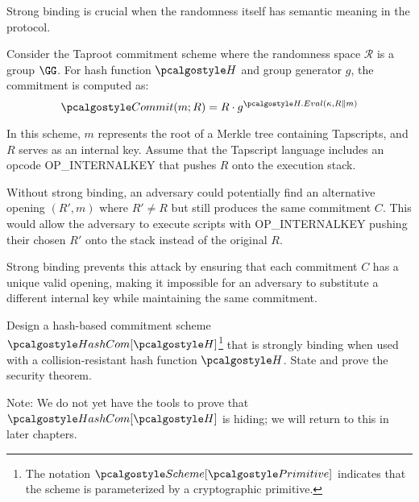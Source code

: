 \ifsolutions
\begin{mysolution}
  Strong binding is crucial when the randomness itself has semantic meaning in the protocol.

  Consider the Taproot commitment scheme where the randomness space $\mathcal{R}$ is a group $\GG$.
  For hash function $\algo{H}$ and group generator $g$, the commitment is computed as:
  \[
    \algo{Commit}(m; R) = R \cdot g^{\algo{H.Eval}(\kappa, R \| m)}
  \]

  In this scheme, $m$ represents the root of a Merkle tree containing Tapscripts, and $R$ serves as an internal key.
  Assume that the Tapscript language includes an opcode OP\_INTERNALKEY that pushes $R$ onto the execution stack.

  Without strong binding, an adversary could potentially find an alternative opening $(R', m)$ where $R' \neq R$ but still produces the same commitment $C$.
  This would allow the adversary to execute scripts with OP\_INTERNALKEY pushing their chosen $R'$ onto the stack instead of the original $R$.

  Strong binding prevents this attack by ensuring that each commitment $C$ has a unique valid opening, making it impossible for an adversary to substitute a different internal key while maintaining the same commitment.
\end{mysolution}
\fi

\begin{exercise}
  Design a hash-based commitment scheme $\algo{HashCom}[\algo{H}]$\footnote{The notation $\algo{Scheme}[\algo{Primitive}]$ indicates that the scheme is parameterized by a cryptographic primitive.} that is strongly binding when used with a collision-resistant hash function $\algo{H}$.
  State and prove the security theorem.
  
  Note: We do not yet have the tools to prove that $\algo{HashCom}[\algo{H}]$ is hiding; we will return to this in later chapters.
\end{exercise}

